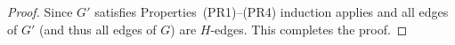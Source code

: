 \begin{proof}
	
	
	Since $G'$ satisfies Properties~(PR1)--(PR4) induction applies and all edges of $G'$ (and thus all edges of $G$) are $H$-edges. This completes the proof.
\end{proof}


